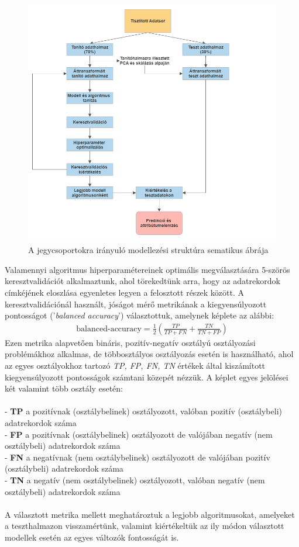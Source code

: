 \documentclass[12pt]{article}
\begin{document}
\begin{figure}[h]
\centering
\includegraphics[scale=0.6]{kepek/flowchart.png}
\caption{A jegycsoportokra irányuló modellezési struktúra sematikus ábrája}
\label{fig:modell}
\end{figure}

Valamennyi algoritmus hiperparamétereinek optimális megválasztására 5-szörös keresztvalidációt alkalmaztunk, ahol törekedtünk arra, hogy az adatrekordok címkéjének eloszlása egyenletes legyen a felosztott részek között. A keresztvalidációnál használt, jóságot mérő metrikának a kiegyensúlyozott pontosságot ('\textit{balanced accuracy}') választottuk, amelynek képlete az alábbi:
\begin{align*}
\text{balanced-accuracy} = \frac{1}{2}\left(\frac{TP}{TP+FN} + \frac{TN}{TN+FP} \right) 
\end{align*}Ezen metrika alapvetően bináris, pozitív-negatív osztályú osztályozási problémákhoz alkalmas, de többosztályos osztályozás esetén is használható, ahol az egyes osztályokhoz tartozó \textit{TP, FP, FN, TN} értékek által kiszámított kiegyensúlyozott pontosságok számtani közepét nézzük. A képlet egyes jelölései két valamint több osztály esetén:  \\ \\
- \textbf{TP} a pozitívnak (osztálybelinek) osztályozott, valóban pozitív (osztálybeli) adatrekordok száma \\
- \textbf{FP} a pozitívnak (osztálybelinek) osztályozott de valójában negatív (nem osztálybeli) adatrekordok száma \\
- \textbf{FN} a negatívnak (nem osztálybelinek) osztályozott de valójában pozitív (osztálybeli) adatrekordok száma \\
- \textbf{TN} a negatív (nem osztálybelinek) osztályozott, valóban negatív (nem osztálybeli) adatrekordok száma \\ 
\\
A választott metrika mellett meghatároztuk a legjobb algoritmusokat, amelyeket a teszthalmazon visszamértünk, valamint kiértékeltük az ily módon választott modellek esetén az egyes változók fontosságát is.
\end{document}
